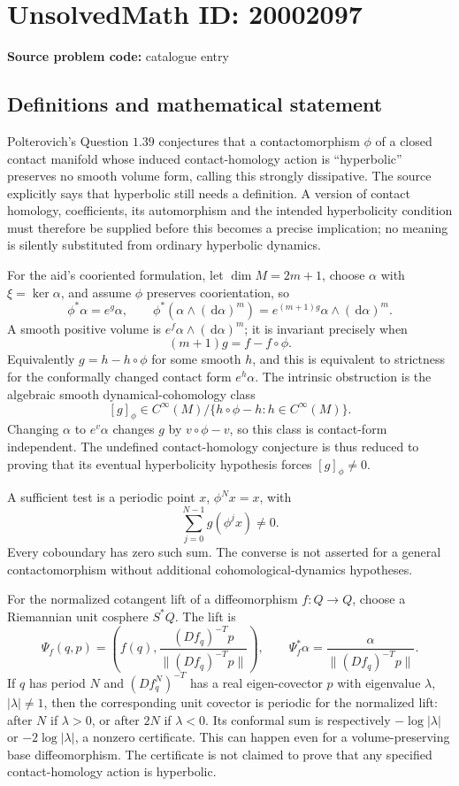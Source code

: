 \documentclass[11pt]{article}
\newcommand{\dd}{\,\mathrm{d}}
\begin{document}
\section*{UnsolvedMath ID: 20002097}
\textbf{Source problem code:} catalogue entry
\subsection{Definitions and mathematical statement}
Polterovich's Question \(1.39\) conjectures that a contactomorphism \(\phi\) of a closed contact manifold whose induced contact-homology action is ``hyperbolic'' preserves no smooth volume form, calling this strongly dissipative. The source explicitly says that hyperbolic still needs a definition. A version of contact homology, coefficients, its automorphism and the intended hyperbolicity condition must therefore be supplied before this becomes a precise implication; no meaning is silently substituted from ordinary hyperbolic dynamics.

For the aid's cooriented formulation, let \(\dim M=2m+1\), choose \(\alpha\) with \(\xi=\ker\alpha\), and assume \(\phi\) preserves coorientation, so
\[
 \phi^*\alpha=e^g\alpha,\qquad
 \phi^*(\alpha\wedge(\dd\alpha)^m)
       =e^{(m+1)g}\alpha\wedge(\dd\alpha)^m.
\]
A smooth positive volume is \(e^f\alpha\wedge(\dd\alpha)^m\); it is invariant precisely when
\[
 (m+1)g=f-f\circ\phi.
\]
Equivalently \(g=h-h\circ\phi\) for some smooth \(h\), and this is equivalent to strictness for the conformally changed contact form \(e^h\alpha\). The intrinsic obstruction is the algebraic smooth dynamical-cohomology class
\[
 [g]_\phi\in C^\infty(M)/\{h\circ\phi-h:h\in C^\infty(M)\}.
\]
Changing \(\alpha\) to \(e^v\alpha\) changes \(g\) by \(v\circ\phi-v\), so this class is contact-form independent. The undefined contact-homology conjecture is thus reduced to proving that its eventual hyperbolicity hypothesis forces \([g]_\phi\ne0\).

A sufficient test is a periodic point \(x\), \(\phi^N x=x\), with
\[
 \sum_{j=0}^{N-1}g(\phi^j x)\ne0.
\]
Every coboundary has zero such sum. The converse is not asserted for a general contactomorphism without additional cohomological-dynamics hypotheses.

For the normalized cotangent lift of a diffeomorphism \(f:Q\to Q\), choose a Riemannian unit cosphere \(S^*Q\). The lift is
\[
 \Psi_f(q,p)=\left(f(q),\frac{(Df_q)^{-T}p}{\|(Df_q)^{-T}p\|}\right),
 \qquad \Psi_f^*\alpha=\frac{\alpha}{\|(Df_q)^{-T}p\|}.
\]
If \(q\) has period \(N\) and \((Df_q^N)^{-T}\) has a real eigen-covector \(p\) with eigenvalue \(\lambda\), \(|\lambda|\ne1\), then the corresponding unit covector is periodic for the normalized lift: after \(N\) if \(\lambda>0\), or after \(2N\) if \(\lambda<0\). Its conformal sum is respectively \(-\log|\lambda|\) or \(-2\log|\lambda|\), a nonzero certificate. This can happen even for a volume-preserving base diffeomorphism. The certificate is not claimed to prove that any specified contact-homology action is hyperbolic.
\end{document}
